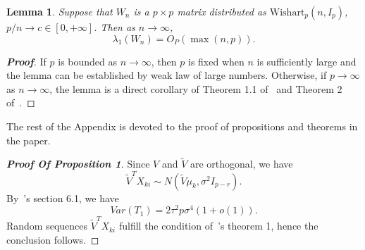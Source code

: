 \documentclass[review]{elsarticle}
\theoremstyle{plain}
\newtheorem{lemma}{Lemma}
\theoremstyle{definition}
\theoremstyle{remark}
\begin{document}
\begin{lemma}\label{maxEigen}
    Suppose that $W_n$ is a $p \times p$ matrix distributed as $\textrm{Wishart}_p(n,I_{p})$, $p/n\to c\in [0,+\infty]$. Then as $n\to \infty$,
    $$
        \lambda_1(W_n)=O_P(\max(n,p)).
    $$
\end{lemma}
\begin{proof}[\textbf{Proof}]
    If $p$ is bounded as $n\to \infty$, then $p$ is fixed when $n$ is sufficiently large and the lemma can be established by weak law of large numbers. Otherwise, if $p\to \infty$ as $n\to \infty$, the lemma is a direct corollary of Theorem 1.1 of~\cite{Johnstone2001On} and Theorem 2 of~\cite{Karoui2003On}.
\end{proof}











The rest of the Appendix is devoted to the proof of propositions and theorems in the paper.
\begin{proof}[\textbf{Proof Of Proposition 1}]
Since $V$ and $\tilde{V}$ are orthogonal, we have
  $$\tilde{V}^T X_{ki}\sim N(\tilde{V}\mu_k,\sigma^2 I_{p-r}).$$
 By~\cite{Chen2010A}'s section 6.1, we have
\begin{equation*}
Var(T_1)=2\tau^2 p\sigma^4(1+o(1)).
\end{equation*}
Random sequences $\tilde{V}^T X_{ki}$ fulfill the condition of~\cite{Chen2010A}'s theorem 1, hence the conclusion follows.
\end{proof}



\end{document}
